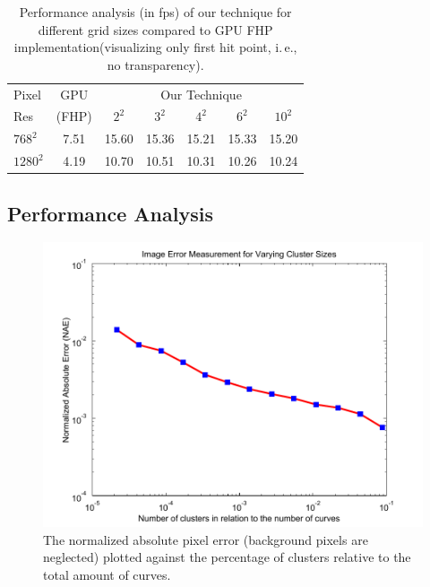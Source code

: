 \documentclass[review,journal]{vgtc}         %
\begin{document}
\begin{table}[b]
  \caption{Performance analysis (in fps) of our technique for different grid sizes compared to GPU FHP implementation(visualizing only first hit point, i.\,e., no transparency).}
  \label{tab:performance}
  \begin{center}
    \begin{tabular}{|l|c|c|c|c|c|c|}
      \hline
      Pixel & GPU & \multicolumn{5}{c|}{Our Technique}\\
      Res & (FHP) & $2^2$ & $3^2$ & $4^2$ & $6^2$ & $10^2$ \\
      \hline
      $768^2$ & 7.51 & 15.60 & 15.36 & 15.21 & 15.33 & 15.20\\
      $1280^2$ & 4.19 & 10.70 & 10.51 & 10.31 & 10.26 & 10.24\\
      \hline
    \end{tabular}
  \end{center}
\end{table}

\subsection{Performance Analysis}\label{subsec:performance}

\begin{figure}[t]
    \centering 
		\includegraphics[width=0.8\linewidth]{figures/cluster_measurements/heart3/clusterErrorPlot}
    \caption{The normalized absolute pixel error (background pixels are neglected) plotted against the percentage of clusters relative to the total amount of curves.}
    \label{fig:clustering_visual_error}
\end{figure}
\end{document}
